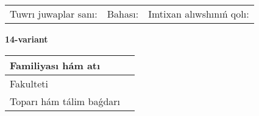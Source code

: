 \documentclass{article}
\begin{document}
\vspace{1cm}

\begin{tabular}{lll}
Tuwrı juwaplar sanı: \underline{\hspace{1.5cm}} & 
Bahası: \underline{\hspace{1.5cm}} & 
Imtixan alıwshınıń qolı: \underline{\hspace{2cm}} \\
\end{tabular}

\egroup

\newpage


\textbf{14-variant}\\

\bgroup
\def\arraystretch{1.6} %

\begin{tabular}{|m{5.7cm}|m{9.5cm}|}
\hline
Familiyası hám atı & \\
\hline
Fakulteti  & \\
\hline
Toparı hám tálim baǵdarı  & \\
\hline
\end{tabular}

\vspace{1cm}
\end{document}
